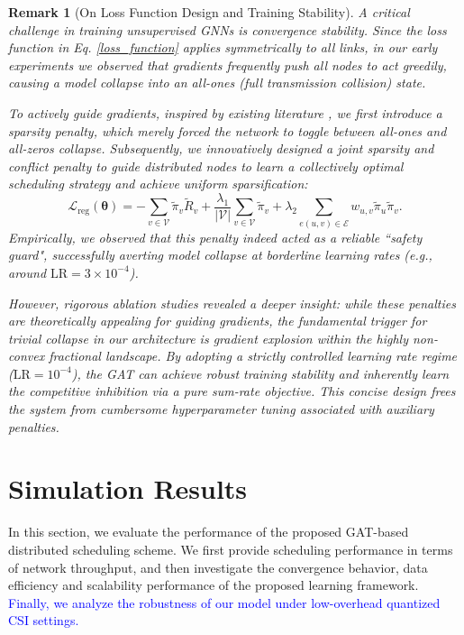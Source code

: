 \documentclass[journal]{IEEEtran}
\newtheorem{remark}{Remark}
\begin{document}
	\begin{remark}[On Loss Function Design and Training Stability]
		A critical challenge in training unsupervised GNNs is convergence stability. Since the loss function in Eq. \eqref{loss_function} applies symmetrically to all links, in our early experiments we observed that gradients frequently push all nodes to act greedily, causing a model collapse into an all-ones (full transmission collision) state.
		
		To actively guide gradients, inspired by existing literature \cite{spatialDL}, we first introduce a sparsity penalty, which merely forced the network to toggle between all-ones and all-zeros collapse. Subsequently, we innovatively designed a joint sparsity and conflict penalty to guide distributed nodes to learn a collectively optimal scheduling strategy and achieve uniform sparsification:
		\begin{equation}
			\mathcal{L}_{\mathrm{reg}}(\boldsymbol{\theta}) = - \sum_{v\in\mathcal{V}} \tilde{\pi}_v \tilde{R}_v + \frac{\lambda_1}{|\mathcal{V}|}\sum_{v\in\mathcal{V}} \tilde{\pi}_v + \lambda_2 \sum_{e(u,v)\in\mathcal{E}} w_{u,v}\tilde{\pi}_u\tilde{\pi}_v.
		\end{equation}
		Empirically, we observed that this penalty indeed acted as a reliable ``safety guard", successfully averting model collapse at borderline learning rates (e.g., around $\text{LR} = 3\times 10^{-4}$).
		
		However, rigorous ablation studies revealed a deeper insight: while these penalties are theoretically appealing for guiding gradients, the fundamental trigger for trivial collapse in our architecture is gradient explosion within the highly non-convex fractional landscape. By adopting a strictly controlled learning rate regime ($\text{LR} = 10^{-4}$), the GAT can achieve robust training stability and inherently learn the competitive inhibition via a pure sum-rate objective. This concise design frees the system from cumbersome hyperparameter tuning associated with auxiliary penalties.
	\end{remark}
	
	\section{Simulation Results}\label{s4}
	In this section, we evaluate the performance of the proposed GAT-based distributed scheduling scheme. We first provide scheduling performance in terms of network throughput, and then investigate the convergence behavior, data efficiency and scalability performance of the proposed learning framework. \textcolor{blue}{Finally, we analyze the robustness of our model under low-overhead quantized CSI settings.}
	
\end{document}
